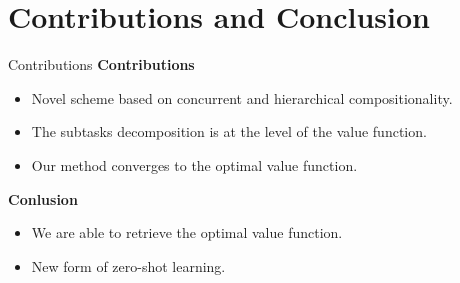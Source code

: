 \documentclass{beamer}
\theoremstyle{mystyle}
\newcommand{\cS}{\mathcal{S}}
\begin{document}
\section{Contributions and Conclusion}
\begin{frame}{Contributions}
    \textbf{Contributions}

    \begin{itemize}
    \item Novel scheme based on concurrent and hierarchical compositionality. 
    \item The subtasks decomposition is at the level of the value function.
    \item Our method converges to the optimal value function.
    \end{itemize}

    \textbf{Conlusion}
    \begin{itemize}
        \item We are able to retrieve the optimal value function.
        \item New form of zero-shot learning.
    \end{itemize}

\end{frame}


\begin{frame}[allowframebreaks]{}
    
    
\end{frame}
\end{document}

